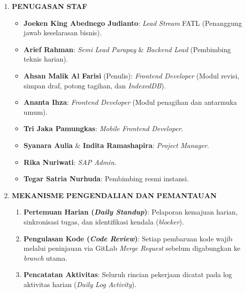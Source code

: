 \begin{framed}
\begin{enumerate}[label=\arabic*.,leftmargin=0.8cm,itemsep=8pt,topsep=4pt,parsep=0pt,partopsep=0pt]
\item \textbf{PENUGASAN STAF}
  \begin{itemize}[topsep=2pt,itemsep=2pt,parsep=0pt,partopsep=0pt,leftmargin=0.5cm]
    \item \textbf{Joeken King Abednego Judianto}: \textit{Lead Stream} FATL (Penanggung jawab keselarasan bisnis).
    \item \textbf{Arief Rahman}: \textit{Semi Lead Parapay} \& \textit{Backend Lead} (Pembimbing teknis harian).
    \item \textbf{Ahsan Malik Al Farisi} (Penulis): \textit{Frontend Developer} (Modul revisi, simpan draf, potong tagihan, dan \textit{IndexedDB}).
    \item \textbf{Ananta Ihza}: \textit{Frontend Developer} (Modul penagihan dan antarmuka umum).
    \item \textbf{Tri Jaka Pamungkas}: \textit{Mobile Frontend Developer}.
    \item \textbf{Syanara Aulia} \& \textbf{Indita Ramashapira}: \textit{Project Manager}.
    \item \textbf{Rika Nuriwati}: \textit{SAP Admin}.
    \item \textbf{Tegar Satria Nurhuda}: Pembimbing resmi instansi.
  \end{itemize}

\item \textbf{MEKANISME PENGENDALIAN DAN PEMANTAUAN}
  \begin{enumerate}[label=\alph*),topsep=2pt,itemsep=2pt,parsep=0pt,partopsep=0pt,leftmargin=0.5cm]
    \item \textbf{Pertemuan Harian (\textit{Daily Standup})}: Pelaporan kemajuan harian, sinkronisasi tugas, dan identifikasi kendala (\textit{blocker}).
    \item \textbf{Pengulasan Kode (\textit{Code Review})}: Setiap pembaruan kode wajib melalui peninjauan via GitLab \textit{Merge Request} sebelum digabungkan ke \textit{branch} utama.
    \item \textbf{Pencatatan Aktivitas}: Seluruh rincian pekerjaan dicatat pada log aktivitas harian (\textit{Daily Log Activity}).
  \end{enumerate}


\end{enumerate}
\end{framed}
